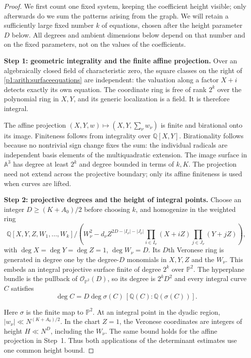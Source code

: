 \begin{proof}
We first count one fixed system, keeping the coefficient height visible;
only afterwards do we sum the patterns arising from the graph.
We will retain a sufficiently large fixed number \(k\) of equations,
chosen after the height parameter \(D\) below.  All degrees and
ambient dimensions below depend on that number and on the fixed parameters,
not on the values of the coefficients.

\medskip\noindent
\textbf{Step 1: geometric integrality and the finite affine projection.}
Over an algebraically closed field of characteristic zero, the square classes on the
right of \eqref{p1:arith:surfaceequations} are independent: the valuation
along a factor $X+i$ detects exactly its own equation.  The coordinate
ring is free of rank $2^k$ over the polynomial ring in $X,Y$, and its
generic localization is a field.  It is therefore integral.

The affine projection $(X,Y,w)\mapsto(X,Y,\sum_\nu w_\nu)$ is finite
and birational onto its image.  Finiteness follows from integrality over
$\mathbb Q[X,Y]$.  Birationality follows because no nontrivial sign change
fixes the sum: the individual radicals are independent basis elements of
the multiquadratic extension.  The image surface in $\mathbb A^3$ has
degree at least $2^k$ and degree bounded in terms of $k,K$.
The projection need not extend across the projective boundary; only its
affine finiteness is used when curves are lifted.

\medskip\noindent
\textbf{Step 2: projective degrees and the height of integral points.}
Choose an integer $D\geq(K+A_0)/2$ before choosing $k$, and homogenize
in the weighted ring
\[
 \mathbb Q[X,Y,Z,W_1,\ldots,W_k]/
 \left(W_\nu^2-d_\nu Z^{2D-|I_\nu|-|J_\nu|}
       \prod_{i\in I_\nu}(X+iZ)\prod_{j\in J_\nu}(Y+jZ)\right),
\]
with $\deg X=\deg Y=\deg Z=1$, $\deg W_\nu=D$.
Its $D$th Veronese ring is generated in degree one by the degree-$D$
monomials in $X,Y,Z$ and the $W_\nu$.  This embeds an integral projective
surface finite of degree $2^k$ over $\mathbb P^2$.  The hyperplane bundle
is the pullback of $\mathcal O_{\mathbb P^2}(D)$, so its degree is
$2^kD^2$ and every integral curve $C$ satisfies
\begin{equation}\label{p1:arith:curvedegree}
 \deg C=D\deg\sigma(C)\,[\mathbb Q(C):\mathbb Q(\sigma(C))].
\end{equation}

Here $\sigma$ is the finite map to $\mathbb P^2$.
At an integral point in the dyadic region,
$|w_\nu|\ll N^{(K+A_0)/2}$.  In the chart $Z=1$, the Veronese
coordinates are integers of height $H\ll N^D$, including the $W_\nu$.
The same bound holds for the affine projection in Step~1.  Thus both
applications of the determinant estimates use one common height bound.


\end{proof}
